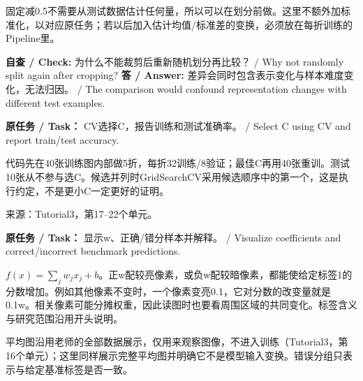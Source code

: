 固定减0.5不需要从测试数据估计任何量，所以可以在划分前做。这里不额外加标准化，以对应原任务；若以后加入估计均值/标准差的变换，必须放在每折训练的Pipeline里。


\textbf{自查 / Check:} 为什么不能裁剪后重新随机划分再比较？ / Why not randomly split again after cropping?
\textbf{答 / Answer:} 差异会同时包含表示变化与样本难度变化，无法归因。 / The comparison would confound representation changes with different test examples.







\textbf{原任务 / Task：} CV选择C，报告训练和测试准确率。 / Select C using CV and report train/test accuracy.


代码先在40张训练图内部做5折，每折32训练/8验证；最佳C再用40张重训。测试10张从不参与选C。候选并列时GridSearchCV采用候选顺序中的第一个，这是执行约定，不是更小C一定更好的证明。


来源：Tutorial3，第17–22个单元。











\textbf{原任务 / Task：} 显示w、正确/错分样本并解释。 / Visualize coefficients and correct/incorrect benchmark predictions.


\(f(x)=\sum_jw_jx_j+b\)。正w配较亮像素，或负w配较暗像素，都能使给定标签1的分数增加。例如其他像素不变时，一个像素变亮0.1，它对分数的改变量就是0.1w。相关像素可能分摊权重，因此读图时也要看周围区域的共同变化。标签含义与研究范围沿用开头说明。


平均图沿用老师的全部数据展示，仅用来观察图像，不进入训练（Tutorial3，第16个单元）；这里同样展示完整平均图并明确它不是模型输入变换。错误分组只表示与给定基准标签是否一致。



